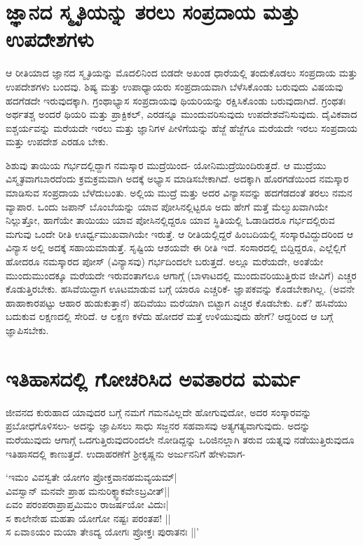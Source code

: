 \section*{ಜ್ಞಾನದ ಸ್ಮೃತಿಯನ್ನು ತರಲು ಸಂಪ್ರದಾಯ ಮತ್ತು ಉಪದೇಶಗಳು}

ಆ ರೀತಿಯಾದ ಜ್ಞಾನದ ಸ್ಮೃತಿಯನ್ನು ಮೊದಲಿನಿಂದ ಬಿಡದೇ ಅಖಂಡ ಧಾರೆಯಲ್ಲಿ ತಂದುಕೊಡಲು ಸಂಪ್ರದಾಯ ಮತ್ತು ಉಪದೇಶಗಳು ಬಂದವು. ಶಿಷ್ಯ ಮತ್ತು ಉಪಾಧ್ಯಾಯರು ಸಂಪ್ರದಾಯವಾಗಿ ಬೆಳೆಸಿಕೊಂಡು ಬರುವುದು ವಿಷಯವು ಹದಗೆಡದೇ ಇರುವುದಕ್ಕಾಗಿ. ಗ್ರಂಥಾಭ್ಯಾಸ ಸಂಪ್ರದಾಯವು ಥಿಯರಿಯನ್ನು ರಕ್ಷಿಸಿಕೊಂಡು ಬರುವುದಾಗಿದೆ. ಗ್ರಂಥತಃ ಅರ್ಥತಶ್ಚ ಅಂದರೆ ಥಿಯರಿ ಮತ್ತು ಪ್ರಾಕ್ಟಿಕಲ್, ಎರಡನ್ನೂ ಮುಂದುವರಿಸುವುದು ಉಪದೇಶವೆನಿಸುವುದು. ದೈವಿಕವಾದ ಐಶ್ಚರ್ಯವನ್ನು ಮರೆಯದೇ ಇರಲು ಮತ್ತು ಜ್ಞಾನಿಗಳ ಪೀಳಿಗೆಯನ್ನು ಹೆಜ್ಜೆ ಹೆಜ್ಜೆಗೂ ಮರೆಯದೇ ಇರಲು ಸಂಪ್ರದಾಯ ಮತ್ತು ಉಪದೇಶ ಎರಡೂ ಬೇಕು.

ಶಿಶುವು ತಾಯಿಯ ಗರ್ಭದಲ್ಲಿದ್ದಾಗ ನಮಸ್ಕಾರ ಮುದ್ರೆಯಿಂದ- ಯೋನಿಮುದ್ರೆಯಿಂದಿರುತ್ತದೆ. ಆ ಮುದ್ರೆಯು ವಿಸ್ಮೃತವಾಗಬಾರದೆಂದು ಕ್ರಮಕ್ರಮವಾಗಿ ಅದಕ್ಕೆ ಅಭ್ಯಾಸ ಮಾಡಿಸಬೇಕಾಗಿದೆ. ಅದಕ್ಕಾಗಿ ಹೊರಗಡೆಯಿಂದ ನಮಸ್ಕಾರ ಮಾಡಿಸುವ ಸಂಪ್ರದಾಯ ಬೆಳೆದುಬಂತು. ಅಲ್ಲಿಯ ಮುದ್ರೆ ಮತ್ತು ಅದರ ವಿನ್ಯಾಸವನ್ನು ಹದಗೆಡದಂತೆ ತರಲು ನಮನ ವ್ಯಾಪಾರ. ಒಂದು ಜಪಾನ್ ಬೊಂಬೆಯನ್ನು ಯಾವ ಪೋಸಿನಲ್ಲಿಟ್ಟರೂ ಅದು ಹೇಗೆ ಮತ್ತೆ ಮೆಲ್ಮುಖವಾಗಿಯೇ ನಿಲ್ಲುತ್ತೋ, ಹಾಗೆಯೇ ತಾಯಿಯು ಯಾವ ಪೋಸಿನಲ್ಲಿದ್ದರೂ ಯಾವ ಸ್ಥಿತಿಯಲ್ಲಿ ಓಡಾಡಿದರೂ ಗರ್ಭದಲ್ಲಿರುವ ಮಗುವು ಒಂದೇ ರೀತಿ ಊರ್ಧ್ವಮುಖವಾಗಿಯೇ ಇರುತ್ತೆ. ಆ ರೀತಿಯಲ್ಲಿದ್ದರೆ ಹಿಂಬದಿಯಲ್ಲಿ ಸಂಸ್ಕಾರವಿದ್ದುದರಿಂದ ಆ ವಿನ್ಯಾಸ ಅಲ್ಲಿ ಅದಕ್ಕೆ ಸಹಾಯಮಾಡುತ್ತೆ. ಸೃಷ್ಟಿಯ ಆಶಯವೇ ಈ ರೀತಿ ಇದೆ. ಸಂಸಾರದಲ್ಲಿ ಬಿದ್ದಿದ್ದರೂ, ಎಲ್ಲೆಲ್ಲಿಗೆ ಹೋದರೂ ನಮಸ್ಕಾರದ ಪೋಸ್ (ವಿನ್ಯಾಸವು) ಗರ್ಭದಿಂದಲೇ ಬರುತ್ತದೆ. ಅಲ್ಲೂ ಮರೆಯದೇ, ಅಂತೆಯೇ ಮುಂದುಮುಂದಕ್ಕೂ ಮರೆಯದೇ ಇರುವಂತಾಗಲೂ ಆಗಾಗ್ಗೆ (ಬಾಳಾಟದಲ್ಲಿ ಮುಂದುವರಿಯುತ್ತಿರುವ ಜೀವಿಗೆ) ಎಚ್ಚರ ಕೊಡುತ್ತಿರಬೇಕು. ಹಸಿವೆಯಿದ್ದಾಗ ಊಟಮಾಡುವ ಬಗ್ಗೆ ಯಾರೂ ಎಚ್ಚರಿಕೆ- ಜ್ಞಾಪಕವನ್ನು ಕೊಡಬೇಕಾಗಿಲ್ಲ. (ಅವನೇ ಹಾಹಾಕಾರಪಟ್ಟು ಆಹಾರ ಹುಡುಕುತ್ತಾನೆ) ಹದಿವೆಯು ಮರೆಯಾಗಿ ಬಿಟ್ಟಾಗ ಎಚ್ಚರ ಕೊಡಬೇಕು. ಏಕೆ? ಹಸಿವೆಯು ಬದುಕುವ ಲಕ್ಷಣದಲ್ಲಿ ಸೇರಿದೆ. ಆ ಲಕ್ಷಣ ಕಳೆದು ಹೋದರೆ ಮತ್ತೆ ಉಳಿಯುವುದು ಹೇಗೆ? ಆದ್ದರಿಂದ ಆ ಬಗ್ಗೆ ಜ್ಞಾಪಿಸಬೇಕು.

\section*{ಇತಿಹಾಸದಲ್ಲಿ ಗೋಚರಿಸಿದ ಅವತಾರದ ಮರ್ಮ}

ಜೀವನದ ಕುರುಹಾದ ಯಾವುದರ ಬಗ್ಗೆ ನಮಗೆ ಗಮನವಿಲ್ಲದೇ ಹೋಗುವುದೋ, ಅದರ ಸಂಸ್ಕಾರವನ್ನು ಪ್ರಬೋಧಗೊಳಿಸಲು- ಅದನ್ನು ಜ್ಞಾಪಿಸಲು ಸಾಧು ಸಜ್ಜನರ ಸಹವಾಸವು ಅತ್ಯಗತ್ಯವಾಗುವುದು. ಅದನ್ನು ಮರೆಯುವುದು ಆಗಾಗ್ಗೆ ಒದಗುತ್ತಿರುವುದರಿಂದಲೇ ನೋಡಿದ್ದನ್ನು ಒರಿಜಿನಲ್ಲಾಗಿ ತರುವ ಯತ್ನವು ನಡೆಯುತ್ತಿರುವುದೂ ಇತಿಹಾಸದಲ್ಲಿ ಕಾಣುತ್ತದೆ. ಉದಾಹರಣೆಗೆ ಶ್ರೀಕೃಷ್ಣನು ಅರ್ಜುನನಿಗೆ ಹೇಳುವಾಗ-

\begin{shloka}
`ಇಮಂ ವಿವಸ್ವತೇ ಯೋಗಂ ಪ್ರೋಕ್ತವಾನಹಮವ್ಯಯಮ್|\label{90}\\
ವಿವಸ್ವಾನ್ ಮನವೇ ಪ್ರಾಹ ಮನುರಿಕ್ಶ್ವಾಕವೇಽಬ್ರವೀತ್||\\
ಏವಂ ಪರಂಪರಾಪ್ರಾಪ್ತಮಿಮಂ ರಾಜರ್ಷಯೋ ವಿದುಃ|\\
ಸ ಕಾಲೇನೇಹ ಮಹತಾ ಯೋಗೋ ನಷ್ಟಃ ಪರಂತಪ! ||\\
ಸ ಏವಾಽಯಂ ಮಯಾ ತೇಽದ್ಯ ಯೋಗಃ ಪ್ರೋಕ್ತಃ ಪುರಾತನಃ ||'
\end{shloka}

